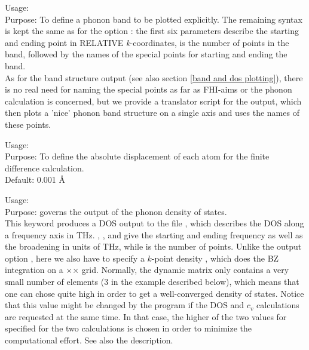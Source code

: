 { Usage:    \\[1.0em]
  Purpose: To define a phonon band to be plotted explicitly. The
  remaining syntax is kept the same as for the  option
  : the first six parameters describe the
  starting and ending point in RELATIVE \emph{k}-coordinates,
   is the number of points in the band, followed by
  the names of the special points for starting and ending the band. \\}
As for the band structure output (see also section \ref{band and dos plotting}), 
there is no real need for naming the special points as far as FHI-aims
or the phonon calculation is concerned, but we provide a translator
script for the output, which then plots a 'nice' phonon band structure
on a single axis and uses the names of these points. 

{ Usage:  
   \\[1.0em]
  Purpose: To define the absolute displacement of each atom for the
  finite difference calculation. \\[1.0em]
  Default: 0.001 \AA\\}

{ Usage:   \\[1.0em]
  Purpose: governs the output of the phonon density of states. \\ }
This keyword produces a DOS output to the file
, which describes the DOS along a frequency
axis in THz. , , and  give
the starting and ending frequency as well as the broadening in units
of THz, while  is the number of points. Unlike the
output option , here we also have to specify a
$k$-point density , which does the BZ integration on
a $\times$$\times$
grid. Normally, the dynamic matrix only contains a very small number
of elements (3 in the example described below), which means that one
can chose  quite high in order to get a
well-converged density of states. Notice that this value might be changed by the program
if the DOS and $c_v$ calculations are requested at the same time. In
that case, the higher of the two values for 
specified for the two calculations is chosen in order to minimize the
computational effort. See also the 
description. 


